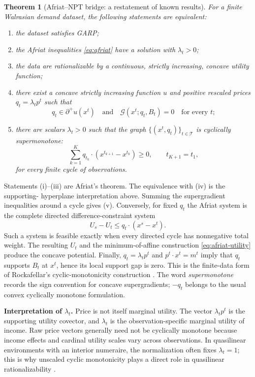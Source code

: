 \documentclass[11pt]{article}
\newcommand{\T}{\mathcal{T}}
\newcommand{\cG}{\mathcal{G}}
\newtheorem{theorem}{Theorem}[section]
\theoremstyle{definition}
\theoremstyle{remark}
\begin{document}
\begin{theorem}[Afriat--NPT bridge: a restatement of known results]
\label{thm:afriat-npt}
For a finite Walrasian demand dataset, the following statements are equivalent:
\begin{enumerate}[label=(\roman*)]
  \item the dataset satisfies GARP;
  \item the Afriat inequalities \eqref{eq:afriat} have a solution with $\lambda_t>0$;
  \item the data are rationalizable by a continuous, strictly increasing, concave utility function;
  \item there exist a concave strictly increasing function $u$ and positive rescaled prices
  $q_t=\lambda_tp^t$ such that
  \[
    q_t\in\partial^+u(x^t)
    \quad\text{and}\quad
    \cG(x^t;q_t,B_t)=0
    \quad\text{for every }t;
  \]
  \item there are scalars $\lambda_t>0$ such that the graph
  $\{(x^t,q_t)\}_{t\in\T}$ is cyclically supermonotone:
  \begin{equation}
    \sum_{k=1}^K
    q_{t_k}\cdot(x^{t_{k+1}}-x^{t_k})\ge0,
    \qquad t_{K+1}=t_1,
    \label{eq:cyclic-supermonotone}
  \end{equation}
  for every finite cycle of observations.
\end{enumerate}
\end{theorem}

Statements (i)--(iii) are Afriat's theorem.  The equivalence with (iv) is the supporting-
hyperplane interpretation above.  Summing the supergradient inequalities around a cycle gives
(v).  Conversely, for fixed $q_t$ the Afriat system is the complete directed difference-constraint
system
\[
  U_s-U_t\le q_t\cdot(x^s-x^t).
\]
Such a system is feasible exactly when every directed cycle has nonnegative total weight.
The resulting $U_t$ and the minimum-of-affine construction \eqref{eq:afriat-utility} produce
the concave potential.  Finally, $q_t=\lambda_tp^t$ and
$p^t\cdot x^t=m^t$ imply that $q_t$ supports $B_t$ at $x^t$, hence its local support gap is
zero.  This is the finite-data form of Rockafellar's cyclic-monotonicity
construction \cite{Rockafellar1966}.  The word \emph{supermonotone} records the sign convention for concave
supergradients; $-q_t$ belongs to the usual convex cyclically monotone formulation.

\begin{keybox}
\textbf{Interpretation of $\lambda_t$.}  Price is not itself marginal utility.  The vector
$\lambda_t p^t$ is the supporting utility covector, and $\lambda_t$ is the observation-specific
marginal utility of income.  Raw price vectors generally need not be cyclically monotone because
income effects and cardinal utility scales vary across observations.  In quasilinear environments
with an interior numeraire, the normalization often fixes $\lambda_t=1$; this is why unscaled
cyclic monotonicity plays a direct role in quasilinear rationalizability \cite{Rochet1987}.
\end{keybox}
\end{document}
